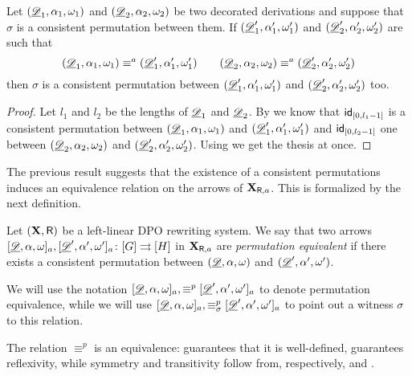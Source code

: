 \begin{corollary}\label{prop:abs}
Let $(\underline{\mathscr{D}}_1, \alpha_1, \omega_1)$ and $(\underline{\mathscr{D}}_2, \alpha_2, \omega_2)$ be two decorated derivations and suppose that $\sigma$ is a consistent permutation between them. If  $(\underline{\mathscr{D}}'_1, \alpha'_1, \omega'_1)$ and $(\underline{\mathscr{D}}'_2, \alpha'_2, \omega'_2)$ are such that
\[ (\underline{\mathscr{D}}_1, \alpha_1, \omega_1)\equiv^a (\underline{\mathscr{D}}'_1, \alpha'_1, \omega'_1) \qquad (\underline{\mathscr{D}}_2, \alpha_2, \omega_2)\equiv^a (\underline{\mathscr{D}}'_2, \alpha'_2, \omega'_2) \] 
then $\sigma$ is a consistent permutation between $(\underline{\mathscr{D}}'_1, \alpha'_1, \omega'_1)$ and $(\underline{\mathscr{D}}'_2, \alpha'_2, \omega'_2)$ too.
\end{corollary}

\begin{proof} Let $l_1$ and $l_2$ be the lengths of $\underline{\mathscr{D}}_1$ and $\underline{\mathscr{D}}_2$. By  we know that  $\mathsf{id}_{[0, l_1-1]}$ is a consistent permutation between  $(\underline{\mathscr{D}}_1, \alpha_1, \omega_1)$ and $(\underline{\mathscr{D}}'_1, \alpha'_1, \omega'_1)$  and $\mathsf{id}_{[0, l_2-1]}$ one between   $(\underline{\mathscr{D}}_2, \alpha_2, \omega_2)$  and $(\underline{\mathscr{D}}'_2, \alpha'_2, \omega'_2)$. Using  we get the thesis at once.
\end{proof}

The previous result suggests that the existence of a consistent permutations induces an equivalence relation on the arrows of $\textbf {\textup{X}}_{\mathsf{R}, a}$. This is formalized by the next definition.

\begin{definition}Let $(\textbf {\textup{X}}, \mathsf{R})$ be a left-linear DPO rewriting system. We say that two arrows
	$[\underline{\mathscr{D}}, \alpha, \omega]_a, [\underline{\mathscr{D}}', \alpha', \omega']_a\colon [G]\rightrightarrows [H]$ in $\textbf {\textup{X}}_{\mathsf{R}, a}$ are \emph{permutation equivalent} if there exists a consistent permutation between $(\underline{\mathscr{D}}, \alpha, \omega)$  and $(\underline{\mathscr{D}}', \alpha', \omega')$. 
	
	We will use the notation $[\underline{\mathscr{D}}, \alpha, \omega]_a, \equiv^p [\underline{\mathscr{D}}', \alpha', \omega']_a$  to denote permutation equivalence, while we will use $[\underline{\mathscr{D}}, \alpha, \omega]_a, \equiv_\sigma^p [\underline{\mathscr{D}}', \alpha', \omega']_a$ to point out a witness $\sigma$ to this relation.
\end{definition}

\begin{remark}
	The relation $\equiv^p$ is an equivalence:  guarantees that it is well-defined,  guarantees reflexivity, while symmetry and transitivity follow from, respectively, 
	 and .
\end{remark}

